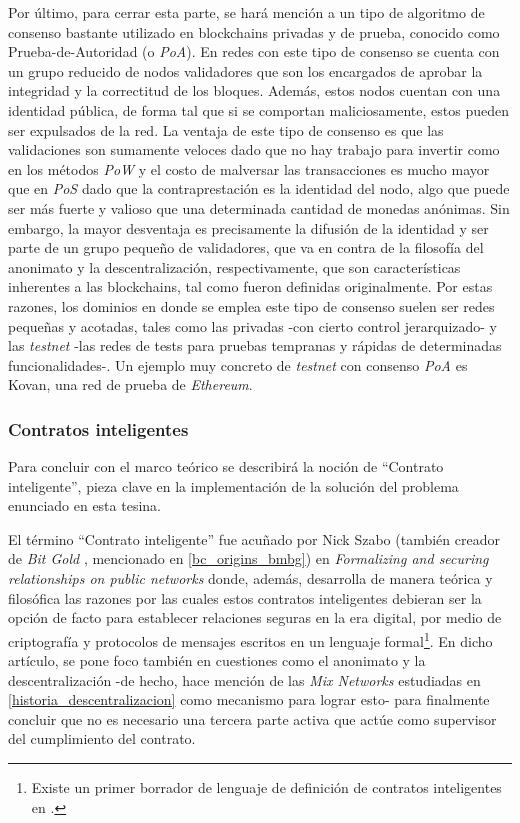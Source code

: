  Por último, para cerrar esta parte, se hará mención a un tipo de algoritmo de consenso bastante utilizado en blockchains privadas y de prueba, conocido como Prueba-de-Autoridad (o \textit{PoA}). En redes con este tipo de consenso se cuenta con un grupo reducido de nodos validadores que son los encargados de aprobar la integridad y la correctitud de los bloques. Además, estos nodos cuentan con una identidad pública, de forma tal que si se comportan maliciosamente, estos pueden ser expulsados de la red. La ventaja de este tipo de consenso es que las validaciones son sumamente veloces dado que no hay trabajo para invertir como en los métodos \textit{PoW} y el costo de malversar las transacciones es mucho mayor que en \textit{PoS} dado que la contraprestación es la identidad del nodo, algo que puede ser más fuerte y valioso que una determinada cantidad de monedas anónimas. Sin embargo, la mayor desventaja es precisamente la difusión de la identidad y ser parte de un grupo pequeño de validadores, que va en contra de la filosofía del anonimato y la descentralización, respectivamente, que son características inherentes a las blockchains, tal como fueron definidas originalmente. Por estas razones, los dominios en donde se emplea este tipo de consenso suelen ser redes pequeñas y acotadas, tales como las privadas -con cierto control jerarquizado- y las \textit{testnet} -las redes de tests para pruebas tempranas y rápidas de determinadas funcionalidades-. Un ejemplo muy concreto de \textit{testnet} con consenso \textit{PoA} es Kovan\cite{Kovan2019}, una red de prueba de \textit{Ethereum}.

\subsubsection{Contratos inteligentes}
\label{bc_ethereum_smart_contracts}

Para concluir con el marco teórico se describirá la noción de ``Contrato inteligente'', pieza clave en la implementación de la solución del problema enunciado en esta tesina.

El término ``Contrato inteligente'' fue acuñado por Nick Szabo (también creador de \textit{Bit Gold} , mencionado en \ref{bc_origins_bmbg}) en \textit{Formalizing and securing relationships on public networks}\cite{Szabo1997} donde, además, desarrolla de manera teórica y filosófica las razones por las cuales estos contratos inteligentes debieran ser la opción de facto para establecer relaciones seguras en la era digital, por medio de criptografía y protocolos de mensajes escritos en un lenguaje formal\footnote{Existe un primer borrador de lenguaje de definición de contratos inteligentes en \cite{Szabo2002}.}. En dicho artículo, se pone foco también en cuestiones como el anonimato y la descentralización -de hecho, hace mención de las \textit{Mix Networks} estudiadas en \ref{historia_descentralizacion} como mecanismo para lograr esto- para finalmente concluir que no es necesario una tercera parte activa que actúe como supervisor del cumplimiento del contrato.


